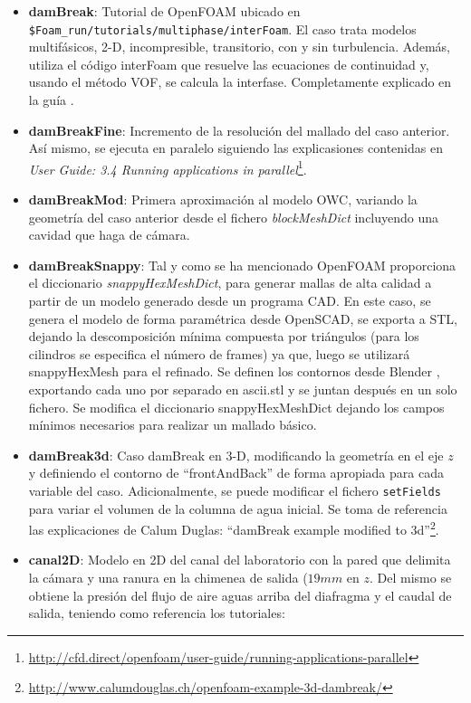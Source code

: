 \begin{itemize}
\item
  \textbf{damBreak}: Tutorial de OpenFOAM ubicado en
  \lstinline[style=bash]{$Foam_run/tutorials/multiphase/interFoam}.
  El caso trata modelos multifásicos, 2-D, incompresible, transitorio,
  con y sin turbulencia. Además, utiliza el código interFoam que
  resuelve las ecuaciones de continuidad y, usando el método VOF, se
  calcula la interfase. Completamente explicado en la guía \cite{dambreak}.
\item
  \textbf{damBreakFine}: Incremento de la resolución del mallado del
  caso anterior. Así mismo, se ejecuta en paralelo siguiendo las
  explicasiones contenidas en \emph{User
  Guide: 3.4 Running applications in parallel}\footnote{\url{http://cfd.direct/openfoam/user-guide/running-applications-parallel}}.
\item
  \textbf{damBreakMod}: Primera aproximación al modelo OWC, variando la
  geometría del caso anterior desde el fichero \emph{blockMeshDict}
  incluyendo una cavidad que haga de cámara.
\item
  \textbf{damBreakSnappy}: Tal y como se ha mencionado OpenFOAM
  proporciona el diccionario \emph{snappyHexMeshDict}, para generar
  mallas de alta calidad a partir de un modelo generado desde un
  programa CAD. En este caso, se genera el modelo de forma paramétrica
  desde OpenSCAD, se exporta a STL, dejando la descomposición mínima
  compuesta por triángulos (para los cilindros se especifica el número
  de frames) ya que, luego se utilizará snappyHexMesh para el refinado.
  Se definen los contornos desde Blender
  \cite{swiftBlock},
  exportando cada uno por separado en ascii.stl y se juntan después en
  un solo fichero. Se modifica el diccionario snappyHexMeshDict dejando
  los campos mínimos necesarios para realizar un mallado básico.
\item
  \textbf{damBreak3d}: Caso damBreak en 3-D, modificando la geometría en
  el eje $z$ y definiendo el contorno de ``frontAndBack'' de forma
  apropiada para cada variable del caso. Adicionalmente, se puede
  modificar el fichero \lstinline[style=bash]{setFields} para variar el volumen de la
  columna de agua inicial. Se toma de referencia las explicaciones de
  Calum
  Duglas: ``damBreak example modified to 3d''\footnote{\url{http://www.calumdouglas.ch/openfoam-example-3d-dambreak/}}.
\item
  \textbf{canal2D}: Modelo en 2D del canal del laboratorio con la pared
  que delimita la cámara y una ranura en la chimenea de salida
  (\(19 mm\) en $z$. Del mismo se obtiene la presión del flujo de
  aire aguas arriba del diafragma y el caudal de salida, teniendo como
  referencia los tutoriales:


\end{itemize}
